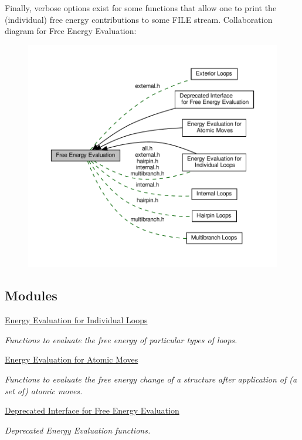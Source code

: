 Finally, {\ttfamily verbose} options exist for some functions that allow one to print the (individual) free energy contributions to some {\ttfamily F\+I\+LE} stream. Collaboration diagram for Free Energy Evaluation\+:
\nopagebreak
\begin{figure}[H]
\begin{center}
\leavevmode
\includegraphics[width=350pt]{group__eval}
\end{center}
\end{figure}
\subsection*{Modules}
\begin{DoxyCompactItemize}
\item 
\hyperlink{group__eval__loops}{Energy Evaluation for Individual Loops}
\begin{DoxyCompactList}\small\item\em Functions to evaluate the free energy of particular types of loops. \end{DoxyCompactList}\item 
\hyperlink{group__eval__move}{Energy Evaluation for Atomic Moves}
\begin{DoxyCompactList}\small\item\em Functions to evaluate the free energy change of a structure after application of (a set of) atomic moves. \end{DoxyCompactList}\item 
\hyperlink{group__eval__deprecated}{Deprecated Interface for Free Energy Evaluation}
\begin{DoxyCompactList}\small\item\em Deprecated Energy Evaluation functions. \end{DoxyCompactList}\end{DoxyCompactItemize}
